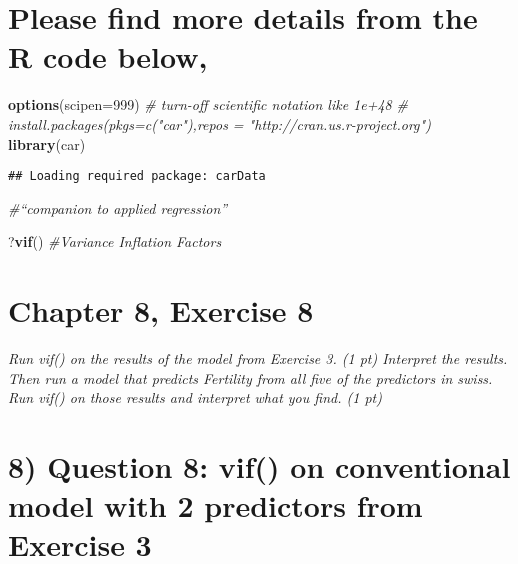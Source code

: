 \documentclass[]{article}
\newenvironment{Shaded}{\begin{snugshade}}{\end{snugshade}}
\newcommand{\CommentTok}[1]{\textcolor[rgb]{0.56,0.35,0.01}{\textit{#1}}}
\newcommand{\DataTypeTok}[1]{\textcolor[rgb]{0.13,0.29,0.53}{#1}}
\newcommand{\DecValTok}[1]{\textcolor[rgb]{0.00,0.00,0.81}{#1}}
\newcommand{\KeywordTok}[1]{\textcolor[rgb]{0.13,0.29,0.53}{\textbf{#1}}}
\newcommand{\NormalTok}[1]{#1}
\begin{document}
\hypertarget{please-find-more-details-from-the-r-code-below-5}{%
\section{Please find more details from the R code
below,}\label{please-find-more-details-from-the-r-code-below-5}}

\begin{Shaded}
\begin{Highlighting}[]
\KeywordTok{options}\NormalTok{(}\DataTypeTok{scipen=}\DecValTok{999}\NormalTok{)  }\CommentTok{# turn-off scientific notation like 1e+48}
\CommentTok{# install.packages(pkgs=c("car"),repos = "http://cran.us.r-project.org")}
\KeywordTok{library}\NormalTok{(car)}
\end{Highlighting}
\end{Shaded}

\begin{verbatim}
## Loading required package: carData
\end{verbatim}

\begin{Shaded}
\begin{Highlighting}[]
\CommentTok{#“companion to applied regression”}


\NormalTok{?}\KeywordTok{vif}\NormalTok{() }\CommentTok{#Variance Inflation Factors}
\end{Highlighting}
\end{Shaded}

\hypertarget{chapter-8-exercise-8}{%
\section{Chapter 8, Exercise 8}\label{chapter-8-exercise-8}}

\emph{Run vif() on the results of the model from Exercise 3. (1 pt)
Interpret the results. Then run a model that predicts Fertility from all
five of the predictors in swiss. Run vif() on those results and
interpret what you find. (1 pt)}

\hypertarget{question-8-vif-on-conventional-model-with-2-predictors-from-exercise-3}{%
\section{8) Question 8: vif() on conventional model with 2 predictors
\textbar{} from Exercise
3}\label{question-8-vif-on-conventional-model-with-2-predictors-from-exercise-3}}
\end{document}
